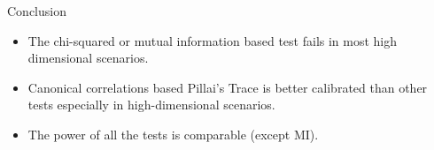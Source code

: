 \documentclass{beamer}
\begin{document}
\begin{frame}{Conclusion}
	\begin{itemize}
		\item The chi-squared or mutual information based test fails in most high dimensional scenarios.
		\item Canonical correlations based Pillai's Trace is better
			calibrated than other tests especially in
			high-dimensional scenarios.
		\item The power of all the tests is comparable (except MI).
	\end{itemize}
\end{frame}
\end{document}
